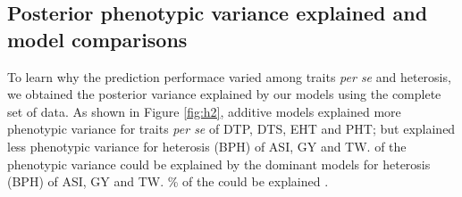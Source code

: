 \documentclass[9pt,twocolumn,twoside]{gsajnl}
\begin{document}
\subsection*{Posterior phenotypic variance explained and model comparisons}

To learn why the prediction performace varied among traits \emph{per se} and heterosis\DIFdelbegin {}\DIFdelend , we obtained the posterior variance explained by our models using the complete set of data. 
As shown in Figure \ref{fig:h2}, additive models explained more phenotypic variance for traits \emph{per se} of DTP, DTS, EHT and PHT; but explained less phenotypic variance for heterosis \DIFdelbegin {}\DIFdelend (BPH) of ASI, GY and TW. 
\DIFdelbegin {}\DIFdelend \DIFaddbegin {}\DIFaddend of the phenotypic variance could be explained by the dominant models for heterosis \DIFdelbegin {}\DIFdelend (BPH) of ASI, GY and TW. 
\DIFdelbegin {}\DIFdelend \DIFaddbegin {}\DIFaddend \% of the \DIFdelbegin {}\DIFdelend \DIFaddbegin {}\emph{} \DIFaddend could be explained \DIFdelbegin {}\DIFdelend \DIFaddbegin {}\DIFaddend . 
\end{document}
